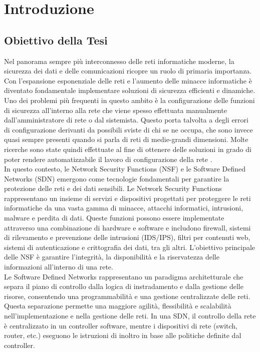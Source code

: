 

\hypersetup{
    colorlinks=true,
    linkcolor=blue
}

\chapter{Introduzione} \label{ch:intro}

\section{Obiettivo della Tesi} 

Nel panorama sempre più interconnesso delle reti informatiche moderne, la sicurezza dei dati e delle comunicazioni ricopre un ruolo di primaria importanza. 
Con l'espansione esponenziale delle reti e l'aumento delle minacce informatiche è diventato fondamentale implementare soluzioni di sicurezza efficienti e dinamiche.
Uno dei problemi più frequenti  in questo ambito è la configurazione delle funzioni di sicurezza all'interno alla rete che viene spesso effettuata
manualmente dall'amministratore di rete o dal sistemista\cite{cit7}. Questo porta talvolta a degli errori di configurazione derivanti da possibili sviste di chi se ne occupa,
che sono invece quasi sempre presenti quando si parla di reti di medie-grandi dimensioni.
Molte ricerche sono state quindi effettuate al fine di ottenere delle soluzioni in grado di poter rendere automatizzabile il lavoro di configurazione della rete \cite{cit1}. \\

In questo contesto, le Network Security Functions (NSF) e le Software Defined Networks (SDN) emergono come tecnologie fondamentali per garantire la protezione delle reti e dei dati sensibili.
Le Network Security Functions rappresentano un insieme di servizi e dispositivi progettati per proteggere le reti informatiche da una vasta gamma di minacce, attacchi informatici, intrusioni, malware e perdita di dati.
Queste funzioni possono essere implementate attraverso una combinazione di hardware e software e includono firewall, sistemi di rilevamento e prevenzione delle intrusioni (IDS/IPS), filtri per contenuti web, sistemi di autenticazione e crittografia dei dati, tra gli altri. 
L'obiettivo principale delle NSF è garantire l'integrità, la disponibilità e la riservatezza delle informazioni all'interno di una rete.\\

Le Software Defined Networks rappresentano un paradigma architetturale che separa il piano di controllo dalla logica di instradamento e dalla gestione delle risorse, consentendo una programmabilità e una gestione centralizzate delle reti. 
Questa separazione permette una maggiore agilità, flessibilità e scalabilità nell'implementazione e nella gestione delle reti. In una SDN, il controllo della rete è centralizzato in un controller software, mentre i dispositivi di rete (switch, router, etc.) eseguono le istruzioni di inoltro in base alle politiche definite dal controller.\\


